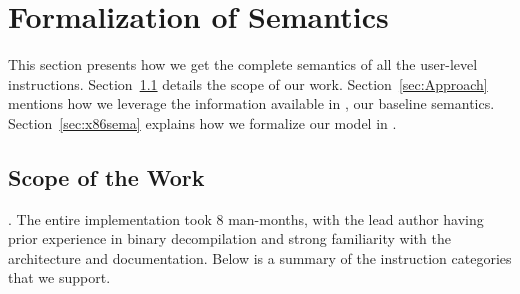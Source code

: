 \section{Formalization of \ISA Semantics}
\label{sec:harvestsema}
This section presents how we get the complete semantics of all the
user-level instructions. Section~\ref{sec:IC} details the scope of our work. Section~\ref{sec:Approach} mentions how we leverage the information available in \Strata, our baseline semantics. Section~\ref{sec:x86sema} explains how we formalize our model in \K.

\subsection{Scope of the Work}\label{sec:IC}
. The entire implementation took 8 man-months, with the lead author having prior experience in binary decompilation and strong familiarity with the \ISA architecture and documentation.
Below is a summary of the instruction categories that we support.
%    
%    

